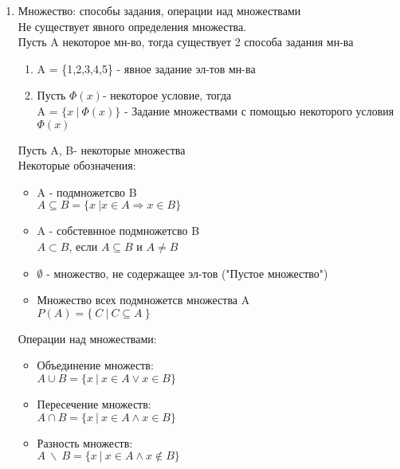 \documentclass{article}
\begin{document}
  \begin{enumerate}
    \item Множество: способы задания, операции над множествами
    \\ Не существует явного определения множества.
    \\ Пусть A некоторое мн-во, тогда существует 2 способа задания мн-ва
          \begin{enumerate}
          \item A = \{1,2,3,4,5\} - явное задание эл-тов мн-ва \\
          \item Пусть $\Phi(x)$- некоторое условие, тогда \\A = $\{x \ | \ \Phi(x) \}$ - Задание множествами с помощью некоторого условия $\Phi(x)$
          \end{enumerate}
      Пусть A, B- некоторые множества \\
      Некоторые обозначения:
      \begin{itemize}
          \item A - подмножетсво B \\
          $A \subseteq B = \{x \ | x\in{A} \Rightarrow x\in{B} \}$
          \item A - собстевнное подмножетсво B \\
          $A \subset B$, если $A \subseteq B$ и $A\ne{B} $
          \item $\emptyset$ - множество, не содержащее эл-тов ("Пустое множество")
          \item Множество всех подмножетсв множества A
          \\ $P(A) = \{ \ C\ |\ C \subseteq{A} \ \} $

      \end{itemize}
      Операции над множествами:
      \begin{itemize}
        \item Объединение множеств:
        \\ $A\cup{B} = \{ x \ | \ x \in{A} \lor x\in{B}\}$
        \item Пересечение множеств:
        \\ $A\cap{B} = \{ x \ | \ x \in{A} \land x\in{B}\}$
        \item Разность множеств:
        \\ $A \ \backslash\  B = \{x\ | \ x\in{A} \land x\notin{B} \}$
      \end{itemize}
  \end{enumerate}
\end{document}
